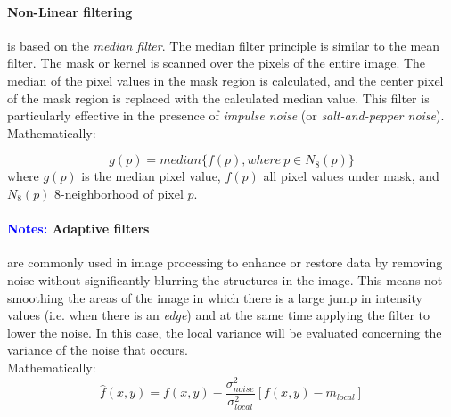 \documentclass{standalone}
\begin{document}
\paragraph{Non-Linear filtering} is based on the \textit{median filter}\cite{filters}.
The median filter principle is similar to the mean filter. 
The mask or kernel is scanned over the pixels of the entire image.
The median of the pixel values in the mask region is calculated, and the center pixel of the mask region is replaced with the calculated median value\cite{filters}.
This filter is particularly effective in the presence of \textit{impulse noise} (or \textit{salt-and-pepper noise})\cite{corrandconv}.\\
Mathematically:

\begin{equation}
    g(p) = median\{f(p), where \: p \in N_8(p)\}
\end{equation}
where $g(p)$ is the median pixel value, $f(p)$ all pixel values under mask, and $N_8(p)$ 8-neighborhood of pixel $p$.


\paragraph{\textcolor{blue}{Notes:} Adaptive filters} 
are commonly used in image processing to enhance or restore data by removing noise without significantly blurring the structures in the image\cite{Adaptive}.
This means not smoothing the areas of the image in which there is a large jump in intensity values (i.e. when there is an \textit{edge}) and at the same time applying the filter to lower the noise.
In this case, the local variance will be evaluated concerning the variance of the noise that occurs.\\
Mathematically:
\begin{equation}
    \hat{f}(x, y) = f(x, y) - \frac{\sigma_{noise}^2}{\sigma_{local}^2}[f(x, y) - m_{local}]
\end{equation}
\end{document}
